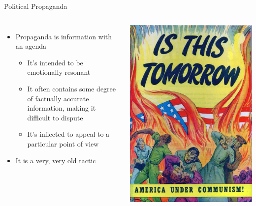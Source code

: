 \documentclass[nobackground,dvipsnames,table,aspectratio=169]{beamer}
\begin{document}
\begin{frame}{Political Propaganda}
    \begin{columns}
            \begin{itemize}
                \item Propaganda is information with an agenda
                \begin{itemize}
                    \item It’s intended to be emotionally resonant 
                    \item It often contains some degree of factually accurate information, making it difficult to dispute
                    \item It’s inflected to appeal to a particular point of view
                \end{itemize}
                \item It is a very, very old tactic  
            \end{itemize}
            \includegraphics[width=\textwidth]{is-this-tomorrow}
    \end{columns}
\end{frame}
\end{document}
